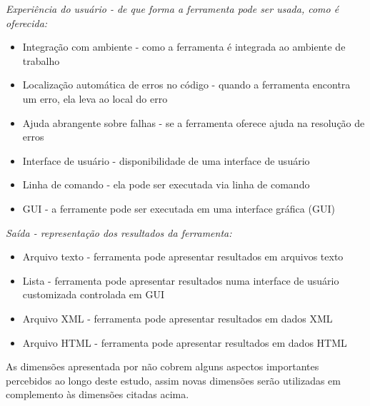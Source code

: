 \begin{description}
  \item {\it Experiência do usuário - de que forma a ferramenta pode ser usada, como é oferecida:}
    \begin{itemize}
      \item Integração com ambiente - como a ferramenta é integrada ao ambiente de trabalho
      \item Localização automática de erros no código - quando a ferramenta encontra um erro, ela leva ao local do erro
      \item Ajuda abrangente sobre falhas - se a ferramenta oferece ajuda na resolução de erros
      \item Interface de usuário - disponibilidade de uma interface de usuário
      \item Linha de comando - ela pode ser executada via linha de comando
      \item GUI - a ferramente pode ser executada em uma interface gráfica (GUI)
    \end{itemize}

  \item {\it Saída - representação dos resultados da ferramenta:}
    \begin{itemize}
      \item Arquivo texto - ferramenta pode apresentar resultados em arquivos texto
      \item Lista - ferramenta pode apresentar resultados numa interface de usuário customizada controlada em GUI
      \item Arquivo XML - ferramenta pode apresentar resultados em dados XML
      \item Arquivo HTML - ferramenta pode apresentar resultados em dados HTML
    \end{itemize}

\end{description}

As dimensões apresentada por  não cobrem alguns aspectos
importantes percebidos ao longo deste estudo, assim novas dimensões serão utilizadas
em complemento às dimensões citadas acima.

